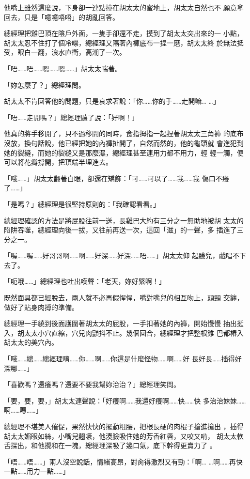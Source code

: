他嘴上雖然這麼說，下身卻一連點撞在胡太太的蜜地上，胡太太自然也不
願意拿回去，只是「噫噫唔唔」的胡亂回答。

總經理把雞巴頂在陰戶外面，一隻手卻還不走，摸到了胡太太突出來的一
小點，胡太太忍不住打了個冷噤，總經理又隔著內褲底布一捏一磨，胡太太終
於無法抵受，眼白一翻，浪水直衝，高潮了一次。

「唔……唔……嗯……嗯……」胡太太喘著。

「妳怎麼了？」總經理問。

胡太太不肯回答他的問題，只是哀求著說：「你……你的手……走開嘛…
…」

「唔……走開嗎？」總經理聽了說：「好啊！」

他真的將手移開了，只不過移開的同時，食指拇指一起捏著胡太太三角褲
的底布沒放，換句話說，他已經把她的內褲扯開了，自然而然的，他的龜頭就
會進犯到她的裂縫，而她的裂縫又是那麼濕，總經理甚至連用力都不用力，輕
輕一觸，便可以將花瓣撐開，把頂端半埋進去。

「哦……」胡太太翻著白眼，卻還在矯飾：「可……可以了……我……我
傷口不癢了……」

「是嗎？」總經理是很堅持原則的：「我確認看看。」

總經理確認的方法是將屁股往前一送，長雞巴大約有三分之一無助地被胡
太太的陷阱吞噬，總經理向後一拔，又往前再送一次，這回「滋」的一聲，多
插進了三分之一。

「喔……喔……好哥哥啊……啊……好深……好深……唔……」胡太太仰
起臉兒，戲唱不下去了。

「呃哦……」總經理也吐出嘆聲：「老天，妳好緊啊！」

既然面具都已經脫去，兩人就不必再假惺惺，嘴對嘴兒的相互吻上，頭頸
交纏，做好了貼身肉搏的準備。

總經理一手繞到後面護圍著胡太太的屁股，一手扣著她的內褲，開始慢慢
抽出挺入，胡太太小穴直縮，穴兒肉顫抖不止。幾個回合，總經理才把整根雞
巴都樁入胡太太的美穴內。

「哦……總……總經理唷……你……啊……你這是什麼怪物……啊……好
長好長……插得好深哪……」

「喜歡嗎？還癢嗎？還要不要我幫妳治治？」總經理笑問。

「要，要，要，」胡太太連聲說：「好癢啊……我還好癢啊……快……快
多治治妹妹……啊……嗯……」

總經理不堪美人催促，果然快快的擺動粗腰，把根長硬的肉棍子搶進搶出
，插得胡太太媚眼如絲，小嘴兒翹噘，他湊臉吸住她的芳香紅唇，又咬又啃，
胡太太軟舌探出，和他攪和在一塊，總經理深吸了幾口氣，底下幹得更賣力了
。

「唔……唔……」兩人沒空說話，情緒高昂，對肏得激烈又有勁：「啊…
…啊……再快一點……用力一點……」

